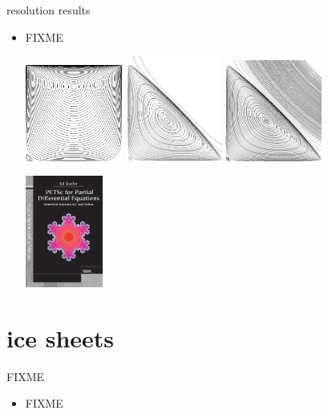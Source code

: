 \documentclass[10pt,hyperref,dvipsnames]{beamer}
\begin{document}
\begin{frame}{resolution results}

\begin{itemize}
\item FIXME
\begin{center}
\includegraphics[width=0.25\textwidth]{figs/eddies1.png} \qquad \includegraphics[width=0.25\textwidth]{figs/eddies2.png} \qquad \includegraphics[width=0.25\textwidth]{figs/eddies3.png}
\end{center}

\hfill \includegraphics[width=0.2\textwidth]{figs/frontcover.jpg}
\end{itemize}
\end{frame}


 
\section{ice sheets}

\begin{frame}{FIXME}

\begin{itemize}
\item FIXME
\end{itemize}
\end{frame}
\end{document}
